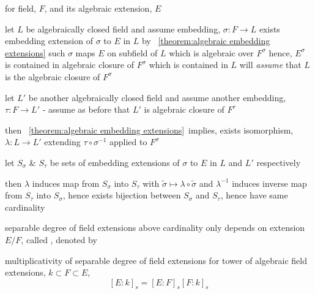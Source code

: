 \documentclass[17pt,landscape]{foils}
\begin{document}
{

\bit
\item
	for field, $F$, and its algebraic extension, $E$
	\bit
	\item
		let $L$ be algebraically closed field and assume embedding, $\sigma:F\to L$
		\bit
		\iitem
			exists embedding extension of $\sigma$ to $E$ in $L$
			by \theoremname~\ref{theorem:algebraic embedding extensions}
		\iitem
			such $\sigma$ maps $E$ on subfield of $L$ which is algebraic over $F^\sigma$
		\iitem
			hence, $E^\sigma$ is contained in algebraic closure of $F^\sigma$ which is contained in $L$
		\iitem
			will \emph{assume} that $L$ is the algebraic closure of $F^\sigma$
		\eit

	\item
		let $L'$ be another algebraically closed field and assume another embedding, $\tau:F\to L'$
		- assume as before that $L'$ is algebraic closure of $F^\tau$

	\item
		then \theoremname~\ref{theorem:algebraic embedding extensions}\
		implies, exists isomorphism, $\lambda:L\to L'$
		extending $\tau\circ \sigma^{-1}$ applied to $F^\sigma$

	\item
		let
			$S_\sigma$ \& $S_\tau$ be sets of embedding extensions of $\sigma$ to $E$ in $L$ and $L'$
			respectively
	\item
		then $\lambda$ induces map from $S_\sigma$ into $S_\tau$ with $\tilde{\sigma} \mapsto \lambda \circ \tilde{\sigma}$
		and $\lambda^{-1}$ induces inverse map from $S_\tau$ into $S_\sigma$,
		hence exists bijection between $S_\sigma$ and $S_\tau$, hence have same cardinality
	\eit
\eit

\begin{mydefinition}{separable degree of field extensions}
	above cardinality only depends on extension $E/F$,
	called ,
	denoted by 
\end{mydefinition}



\begin{mytheorem}{multiplicativity of separable degree of field extensions}
	for tower of algebraic field extensions, $k\subset F\subset E$,
	$$
		[E:k]_s
		=
		[E:F]_s
		[F:k]_s
	$$
\end{mytheorem}

}
\end{document}
